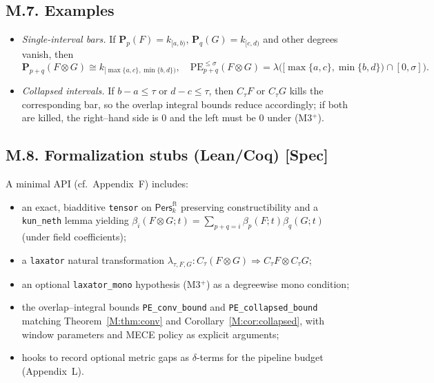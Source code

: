 \documentclass[11pt]{article}
\DeclareRobustCommand{\hyp}{\nobreakdash-}
\newcommand{\Pers}{\mathsf{Pers}}
\numberwithin{equation}{section}
\theoremstyle{definition}
\begin{document}
\subsection*{M.7. Examples}
\begin{itemize}\itemsep0.25em
  \item \emph{Single\hyp interval bars.} If \(\mathbf{P}_p(F)=k_{[a,b)}\), \(\mathbf{P}_q(G)=k_{[c,d)}\) and other degrees vanish, then
  \[
  \mathbf{P}_{p+q}(F\otimes G)\cong k_{[\max\{a,c\},\min\{b,d\})},\quad \mathrm{PE}_{p+q}^{\le \sigma}(F\otimes G)=\lambda\!\big([\max\{a,c\},\min\{b,d\})\cap[0,\sigma]\big).
  \]
  \item \emph{Collapsed intervals.} If \(b-a\le \tau\) or \(d-c\le \tau\), then \(C_\tau F\) or \(C_\tau G\) kills the corresponding bar, so the overlap integral bounds reduce accordingly; if both are killed, the right–hand side is \(0\) and the left must be \(0\) under (M3$^{+}$).
\end{itemize}

\subsection*{M.8. Formalization stubs (Lean/Coq) [Spec]}
A minimal API (cf.\ Appendix~F) includes:
\begin{itemize}\itemsep0.25em
  \item an exact, biadditive \texttt{tensor} on \(\Pers^{\mathrm{ft}}_k\) preserving constructibility and a \texttt{kun\_neth} lemma yielding \(\beta_i(F\otimes G;t)=\sum_{p+q=i}\beta_p(F;t)\beta_q(G;t)\) (under field coefficients);
  \item a \texttt{laxator} natural transformation \(\lambda_{\tau,F,G}:C_\tau(F\otimes G)\Rightarrow C_\tau F\otimes C_\tau G\);
  \item an optional \texttt{laxator\_mono} hypothesis (M3$^{+}$) as a degreewise mono condition;
  \item the overlap--integral bounds \texttt{PE\_conv\_bound} and \texttt{PE\_collapsed\_bound} matching Theorem~\ref{M:thm:conv} and Corollary~\ref{M:cor:collapsed}, with window parameters and MECE policy as explicit arguments;
  \item hooks to record optional metric gaps as \(\delta\)\hyp terms for the pipeline budget (Appendix~L).
\end{itemize}
\end{document}
